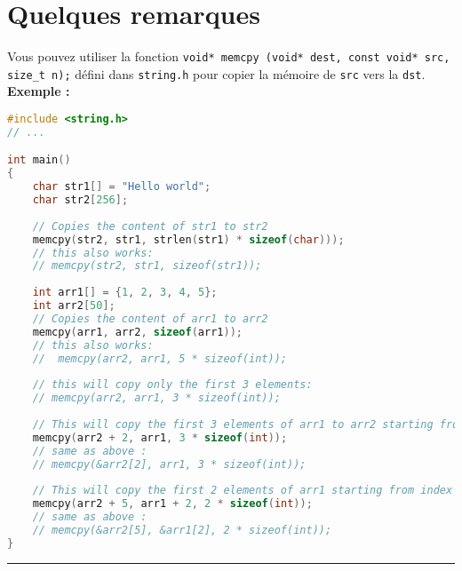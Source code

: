 \documentclass[a4paper]{article}
\begin{document}
	\section*{Quelques remarques}
	Vous pouvez utiliser la fonction \texttt{void* memcpy (void* dest, const void* src, size\_t n);} défini dans \texttt{string.h} pour copier la mémoire de \texttt{src} vers la \texttt{dst}. \\
	\textbf{Exemple :}
	\begin{lstlisting}[language=C]
#include <string.h>
// ...

int main()
{
	char str1[] = "Hello world";
	char str2[256];
	
	// Copies the content of str1 to str2
	memcpy(str2, str1, strlen(str1) * sizeof(char)));
	// this also works: 
	// memcpy(str2, str1, sizeof(str1));
	
	int arr1[] = {1, 2, 3, 4, 5};
	int arr2[50];
	// Copies the content of arr1 to arr2
	memcpy(arr1, arr2, sizeof(arr1));
	// this also works:
	//  memcpy(arr2, arr1, 5 * sizeof(int));
	
	// this will copy only the first 3 elements:
	// memcpy(arr2, arr1, 3 * sizeof(int));
	
	// This will copy the first 3 elements of arr1 to arr2 starting from index 2
	memcpy(arr2 + 2, arr1, 3 * sizeof(int));
	// same as above :
	// memcpy(&arr2[2], arr1, 3 * sizeof(int));
	
	// This will copy the first 2 elements of arr1 starting from index 2 to arr2 starting from index 5
	memcpy(arr2 + 5, arr1 + 2, 2 * sizeof(int));
	// same as above :
	// memcpy(&arr2[5], &arr1[2], 2 * sizeof(int));
}
	\end{lstlisting}

	\bigskip
	\par\noindent\rule{\textwidth}{0.4pt}
\end{document}

